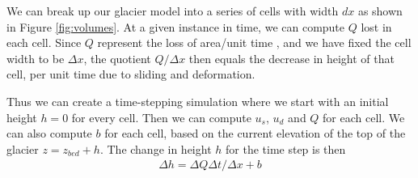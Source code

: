 \documentclass[11pt, oneside]{article}   	%
\begin{document}
We can break up our glacier model into a series of cells with width $dx$ as shown in Figure \ref{fig:volumes}. At a given instance in time, we can compute $Q$ lost in each cell. Since $Q$ represent the loss of area/unit time , and we have fixed the cell width to be $\Delta x$, the quotient $Q / \Delta x$ then equals the decrease in height of that cell, per unit time due to sliding and deformation. 

Thus we can create a time-stepping simulation where we start with an initial height $h=0$ for every cell. Then we can compute $u_s$, $u_d$ and $Q$ for each cell. We can also compute $b$ for each cell, based on the current elevation of the top of the glacier $z = z_{bed} + h$. The change in height $h$ for the time step is then 
\begin{eqnarray}
	\Delta h = \Delta Q\Delta t/\Delta x + b
\end{eqnarray}
\end{document}
